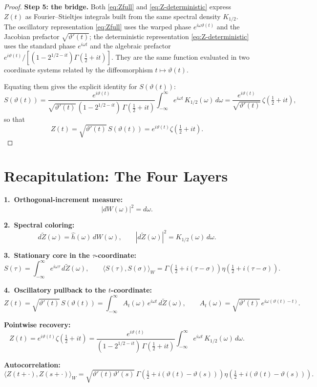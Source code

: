 \documentclass[11pt,a4paper]{article}
\begin{document}
\begin{proof}
\medskip\noindent\textbf{Step 5: the bridge.}
Both \eqref{eq:Zfull} and \eqref{eq:Z-deterministic} express $Z(t)$
as Fourier--Stieltjes integrals built from the same spectral density
$K_{1/2}$. The oscillatory representation \eqref{eq:Zfull} uses the
warped phase $e^{i\omega\vartheta(t)}$ and the Jacobian prefactor
$\sqrt{\vartheta'(t)}$; the deterministic representation
\eqref{eq:Z-deterministic} uses the standard phase $e^{i\omega t}$ and
the algebraic prefactor
$e^{i\vartheta(t)}/[(1-2^{1/2-it})\Gamma(\tfrac{1}{2}+it)]$.
They are the same function evaluated in two coordinate systems related
by the diffeomorphism $t\mapsto\vartheta(t)$.

Equating them gives the explicit identity for $S(\vartheta(t))$:
\begin{equation}
  \label{eq:bridge}
  S(\vartheta(t))
  =\frac{e^{i\vartheta(t)}}
        {\sqrt{\vartheta'(t)}\,(1-2^{1/2-it})\,\Gamma(\tfrac{1}{2}+it)}
   \int_{-\infty}^{\infty} e^{i\omega t}\,K_{1/2}(\omega)\,d\omega
  =\frac{e^{i\vartheta(t)}}{\sqrt{\vartheta'(t)}}\,
   \zeta\!\left(\tfrac{1}{2}+it\right),
\end{equation}
so that
\begin{equation}
  Z(t)=\sqrt{\vartheta'(t)}\,S(\vartheta(t))
      =e^{i\vartheta(t)}\zeta\!\left(\tfrac{1}{2}+it\right).
\end{equation}
\end{proof}


\section{Recapitulation: The Four Layers}

\noindent\textbf{1.\ Orthogonal-increment measure:}
\[
  |dW(\omega)|^2=d\omega.
\]

\noindent\textbf{2.\ Spectral coloring:}
\[
  d\widetilde{Z}(\omega)=\hat{h}(\omega)\,dW(\omega),
  \qquad
  |d\widetilde{Z}(\omega)|^2=K_{1/2}(\omega)\,d\omega.
\]

\noindent\textbf{3.\ Stationary core in the $\tau$-coordinate:}
\[
  S(\tau)=\int_{-\infty}^{\infty} e^{i\omega\tau}\,d\widetilde{Z}(\omega),
  \qquad
  \langle S(\tau),S(\sigma)\rangle_W
  =\Gamma\!\left(\tfrac{1}{2}+i(\tau-\sigma)\right)
   \eta\!\left(\tfrac{1}{2}+i(\tau-\sigma)\right).
\]

\noindent\textbf{4.\ Oscillatory pullback to the $t$-coordinate:}
\[
  Z(t)=\sqrt{\vartheta'(t)}\,S(\vartheta(t))
  =\int_{-\infty}^{\infty}A_t(\omega)\,e^{i\omega t}\,d\widetilde{Z}(\omega),
  \qquad
  A_t(\omega)=\sqrt{\vartheta'(t)}\,e^{i\omega(\vartheta(t)-t)}.
\]

\noindent\textbf{Pointwise recovery:}
\[
  Z(t)=e^{i\vartheta(t)}\zeta\!\left(\tfrac{1}{2}+it\right)
  =\frac{e^{i\vartheta(t)}}{(1-2^{1/2-it})\,\Gamma(\tfrac{1}{2}+it)}
   \int_{-\infty}^{\infty} e^{i\omega t}\,K_{1/2}(\omega)\,d\omega.
\]

\noindent\textbf{Autocorrelation:}
\[
  \langle Z(t+\cdot),Z(s+\cdot)\rangle_W
  =\sqrt{\vartheta'(t)\vartheta'(s)}\,
   \Gamma\!\left(\tfrac{1}{2}+i(\vartheta(t)-\vartheta(s))\right)
   \eta\!\left(\tfrac{1}{2}+i(\vartheta(t)-\vartheta(s))\right).
\]
\end{document}
